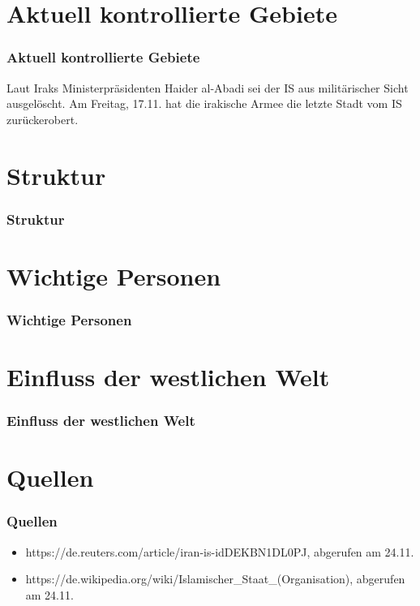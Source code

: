 \documentclass{beamer}
\begin{document}
\section{Aktuell kontrollierte Gebiete}
\begin{frame}
\frametitle{Aktuell kontrollierte Gebiete}
Laut Iraks Ministerpräsidenten Haider al-Abadi sei der IS aus militärischer Sicht ausgelöscht.
Am Freitag, 17.11. hat die irakische Armee die letzte Stadt vom IS zurückerobert.
\end{frame}


\section{Struktur}
\begin{frame}
\frametitle{Struktur}
\end{frame}

\section{Wichtige Personen}
\begin{frame}
\frametitle{Wichtige Personen}
\end{frame}


\section{Einfluss der westlichen Welt}
\begin{frame}
\frametitle{Einfluss der westlichen Welt}

\end{frame}

\section*{Quellen}
\begin{frame}
\frametitle{Quellen}
\begin{itemize}
	\item https://de.reuters.com/article/iran-is-idDEKBN1DL0PJ, abgerufen am 24.11.
	\item https://de.wikipedia.org/wiki/Islamischer\_Staat\_(Organisation), abgerufen am 24.11.
\end{itemize}
\end{frame}
\end{document}
